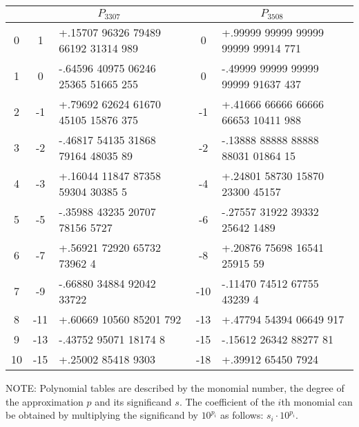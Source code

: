   \begin{center}
    \begin{tabular}{|c||c|l||c|l|}
      \hline
         & \multicolumn{2}{c||}{$P_{3307}$} & \multicolumn{2}{c|}{$P_{3508}$}                                                 \\
      \hline
      0  & 1                                & +.15707 96326 79489 66192 31314 989 & 0   & +.99999 99999 99999 99999 99914 771 \\
      1  & 0                                & -.64596 40975 06246 25365 51665 255 & 0   & -.49999 99999 99999 99999 91637 437 \\
      2  & -1                               & +.79692 62624 61670 45105 15876 375 & -1  & +.41666 66666 66666 66653 10411 988 \\
      3  & -2                               & -.46817 54135 31868 79164 48035 89  & -2  & -.13888 88888 88888 88031 01864 15  \\
      4  & -3                               & +.16044 11847 87358 59304 30385 5   & -4  & +.24801 58730 15870 23300 45157     \\
      5  & -5                               & -.35988 43235 20707 78156 5727      & -6  & -.27557 31922 39332 25642 1489      \\
      6  & -7                               & +.56921 72920 65732 73962 4         & -8  & +.20876 75698 16541 25915 59        \\
      7  & -9                               & -.66880 34884 92042 33722           & -10 & -.11470 74512 67755 43239 4         \\
      8  & -11                              & +.60669 10560 85201 792             & -13 & +.47794 54394 06649 917             \\
      9  & -13                              & -.43752 95071 18174 8               & -15 & -.15612 26342 88277 81              \\
      10 & -15                              & +.25002 85418 9303                  & -18 & +.39912 65450 7924                  \\
      \hline
    \end{tabular}
  \end{center}
  NOTE: Polynomial tables are described by the monomial number, the degree of the approximation $p$ and its significand $s$. The coefficient of the $i$th monomial can be obtained by multiplying the significand by $10^{p_{i}}$ as follows: $s_{i} \cdot 10^{p_{i}}$.

